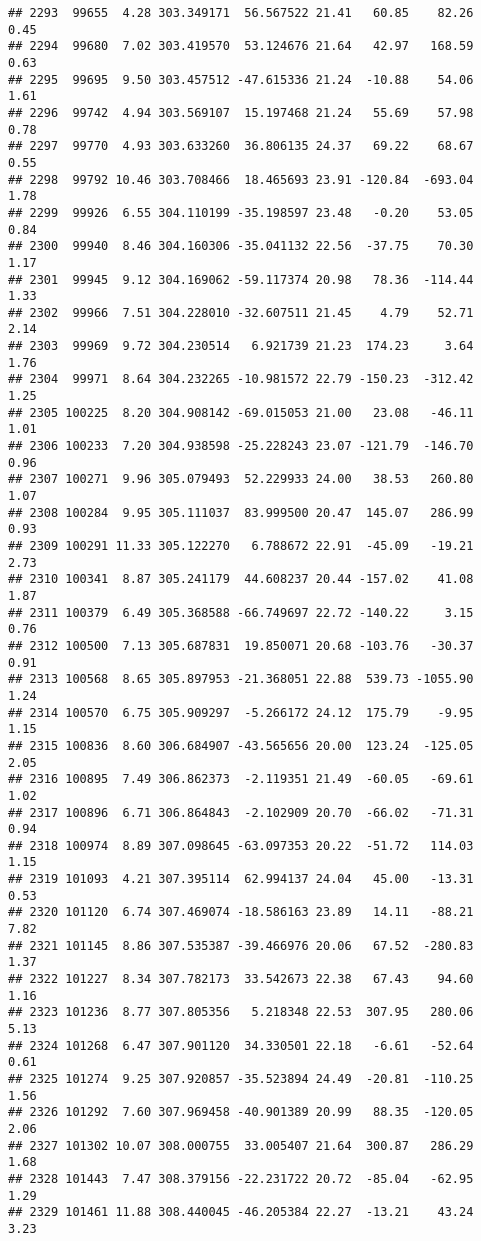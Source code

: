 \documentclass[]{article}
\begin{document}
\begin{verbatim}
## 2293  99655  4.28 303.349171  56.567522 21.41   60.85    82.26  0.45
## 2294  99680  7.02 303.419570  53.124676 21.64   42.97   168.59  0.63
## 2295  99695  9.50 303.457512 -47.615336 21.24  -10.88    54.06  1.61
## 2296  99742  4.94 303.569107  15.197468 21.24   55.69    57.98  0.78
## 2297  99770  4.93 303.633260  36.806135 24.37   69.22    68.67  0.55
## 2298  99792 10.46 303.708466  18.465693 23.91 -120.84  -693.04  1.78
## 2299  99926  6.55 304.110199 -35.198597 23.48   -0.20    53.05  0.84
## 2300  99940  8.46 304.160306 -35.041132 22.56  -37.75    70.30  1.17
## 2301  99945  9.12 304.169062 -59.117374 20.98   78.36  -114.44  1.33
## 2302  99966  7.51 304.228010 -32.607511 21.45    4.79    52.71  2.14
## 2303  99969  9.72 304.230514   6.921739 21.23  174.23     3.64  1.76
## 2304  99971  8.64 304.232265 -10.981572 22.79 -150.23  -312.42  1.25
## 2305 100225  8.20 304.908142 -69.015053 21.00   23.08   -46.11  1.01
## 2306 100233  7.20 304.938598 -25.228243 23.07 -121.79  -146.70  0.96
## 2307 100271  9.96 305.079493  52.229933 24.00   38.53   260.80  1.07
## 2308 100284  9.95 305.111037  83.999500 20.47  145.07   286.99  0.93
## 2309 100291 11.33 305.122270   6.788672 22.91  -45.09   -19.21  2.73
## 2310 100341  8.87 305.241179  44.608237 20.44 -157.02    41.08  1.87
## 2311 100379  6.49 305.368588 -66.749697 22.72 -140.22     3.15  0.76
## 2312 100500  7.13 305.687831  19.850071 20.68 -103.76   -30.37  0.91
## 2313 100568  8.65 305.897953 -21.368051 22.88  539.73 -1055.90  1.24
## 2314 100570  6.75 305.909297  -5.266172 24.12  175.79    -9.95  1.15
## 2315 100836  8.60 306.684907 -43.565656 20.00  123.24  -125.05  2.05
## 2316 100895  7.49 306.862373  -2.119351 21.49  -60.05   -69.61  1.02
## 2317 100896  6.71 306.864843  -2.102909 20.70  -66.02   -71.31  0.94
## 2318 100974  8.89 307.098645 -63.097353 20.22  -51.72   114.03  1.15
## 2319 101093  4.21 307.395114  62.994137 24.04   45.00   -13.31  0.53
## 2320 101120  6.74 307.469074 -18.586163 23.89   14.11   -88.21  7.82
## 2321 101145  8.86 307.535387 -39.466976 20.06   67.52  -280.83  1.37
## 2322 101227  8.34 307.782173  33.542673 22.38   67.43    94.60  1.16
## 2323 101236  8.77 307.805356   5.218348 22.53  307.95   280.06  5.13
## 2324 101268  6.47 307.901120  34.330501 22.18   -6.61   -52.64  0.61
## 2325 101274  9.25 307.920857 -35.523894 24.49  -20.81  -110.25  1.56
## 2326 101292  7.60 307.969458 -40.901389 20.99   88.35  -120.05  2.06
## 2327 101302 10.07 308.000755  33.005407 21.64  300.87   286.29  1.68
## 2328 101443  7.47 308.379156 -22.231722 20.72  -85.04   -62.95  1.29
## 2329 101461 11.88 308.440045 -46.205384 22.27  -13.21    43.24  3.23

\end{verbatim}
\end{document}
